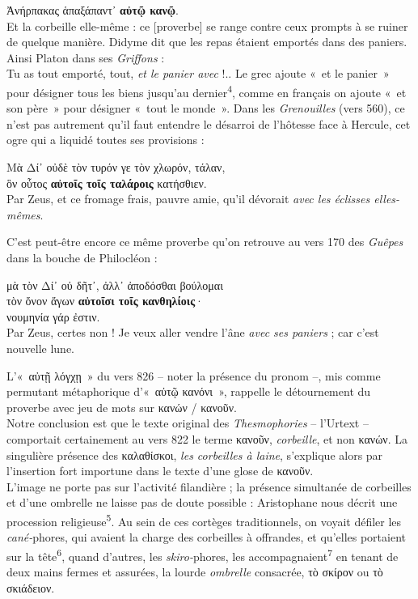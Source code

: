 \documentclass[12pt]{book}%
\newcommand{\italique}[1]{\textit{#1}}%
\newcommand{\citComm}[1]{\begin{quoting}[vskip=0pt] #1 \end{quoting}}%
\newcommand{\allemand}[1]{{\policeAll #1}}%
\newcommand{\marqueur}[1]{\textsuperscript{#1}}%
\newenvironment{groupe}{%
\pstart%
\ledgroup%
}{%
\pend %
}%
\begin{document}
\begin{pages}
\begin{Leftside}
\begin{groupe}
{{{Ἀνήρπακας ἁπαξάπαντ᾿ \textbf{αὐτῷ κανῷ}.\\
Et la corbeille elle-même : ce [proverbe] se range contre ceux prompts à se ruiner de quelque manière. Didyme dit que les repas étaient emportés dans des paniers. Ainsi Platon dans ses \italique{Griffons} :\\
Tu as tout emporté, tout, \italique{et le panier avec} !..}%
Le grec ajoute «~et le panier~» pour désigner tous les biens jusqu'au dernier\marqueur{4}, comme en français on ajoute «~et son père~» pour désigner «~tout le monde~». Dans les \italique{Grenouilles} (vers 560), ce n'est pas autrement qu'il faut entendre le désarroi de l'hôtesse face à Hercule, cet ogre qui a liquidé toutes ses provisions :%
\citComm{Μὰ Δί᾽ οὐδὲ τὸν τυρόν γε τὸν χλωρόν, τάλαν,\\
ὃν οὗτος \textbf{αὐτοῖς τοῖς ταλάροις} κατήσθιεν.\\
Par Zeus, et ce fromage frais, pauvre amie, qu'il dévorait \italique{avec les éclisses elles-mêmes}.}%
C'est peut-être encore ce même proverbe qu'on retrouve au vers 170 des \italique{Guêpes} dans la bouche de Philocléon :%
\citComm{μὰ τὸν Δί᾽ οὐ δῆτ᾽, ἀλλ᾽ ἀποδόσθαι βούλομαι\\
τὸν ὄνον ἄγων \textbf{αὐτοῖσι τοῖς κανθηλίοις}·\\
νουμηνία γάρ ἐστιν.\\
Par Zeus, certes non ! Je veux aller vendre l'âne \italique{avec ses paniers} ; car c'est nouvelle lune.}%
L'«~αὐτῇ λόγχῃ~» du vers 826 -- noter la présence du pronom --, mis comme permutant métaphorique d'«~αὐτῷ κανόνι~», rappelle le détournement du proverbe avec jeu de mots sur κανών / κανοῦν.\\
Notre conclusion est que le texte original des \italique{Thesmophories} -- l'\allemand{Urtext} -- comportait certainement au vers 822 le terme κανοῦν, \italique{corbeille}, et non κανών. %
La singulière présence des καλαθίσκοι, \italique{les corbeilles à laine}, s'explique alors par l'insertion fort importune dans le texte d'une glose de κανοῦν. %
\\
L'image ne porte pas sur l'activité filandière ; la présence simultanée de corbeilles et d'une ombrelle ne laisse pas de doute possible : Aristophane nous décrit une procession religieuse\marqueur{5}. 
Au sein de ces cortèges traditionnels, on voyait défiler les \italique{cané-}phores, qui avaient la charge des corbeilles à offrandes, et qu'elles portaient sur la tête\marqueur{6}, quand d'autres, les \italique{skiro-}phores, les accompagnaient\marqueur{7} en tenant de deux mains fermes et assurées, la lourde \italique{ombrelle} consacrée, τὸ σκίρον ou τὸ σκιάδειον. 
}}
\end{groupe}
\end{Leftside}
\end{pages}
\end{document}
